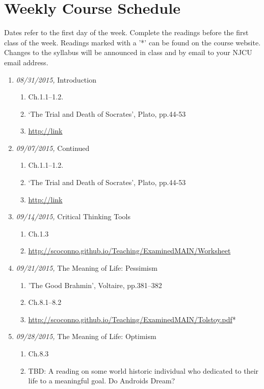 \documentclass[11pt,article,oneside]{memoir}
\begin{document}
\section{Weekly Course Schedule}
Dates refer to the first day of the week. Complete the readings before the first class of the week. Readings marked with a '*' can be found on the course website. Changes to the syllabus will be announced in class and by email to your NJCU email address.  
\begin{enumerate}

\item \textit{08/31/2015,} Introduction 
\begin{enumerate}
\item Ch.1.1--1.2.
\item `The Trial and Death of Socrates', Plato, pp.44-53
\item \href{Animation of Plato's Cave}{http://link}
\end{enumerate}

\item \textit{09/07/2015,} Continued
\begin{enumerate}
\item Ch.1.1--1.2.
\item `The Trial and Death of Socrates', Plato, pp.44-53
\item \href{Animation of Plato's Cave}{http://link}
\end{enumerate}

\item \textit{09/14/2015,} Critical Thinking Tools
\begin{enumerate}
\item Ch.1.3
\item \href{Handout}{http://scoconno.github.io/Teaching/ExaminedMAIN/Worksheet}
\end{enumerate}

\item \textit{09/21/2015,} The Meaning of Life: Pessimism 
\begin{enumerate}
\item 'The Good Brahmin', Voltaire, pp.381--382
\item Ch.8.1--8.2 
\item \href{`A Confession', Leo Tolstoy}{http://scoconno.github.io/Teaching/ExaminedMAIN/Tolstoy.pdf}* 
\end{enumerate}

\item \textit{09/28/2015,} The Meaning of Life: Optimism
\begin{enumerate}
\item Ch.8.3
\item TBD: A reading on some world historic individual who dedicated to their life to a meaningful goal. Do Androids Dream? 
\end{enumerate}


\end{enumerate}
\end{document}

